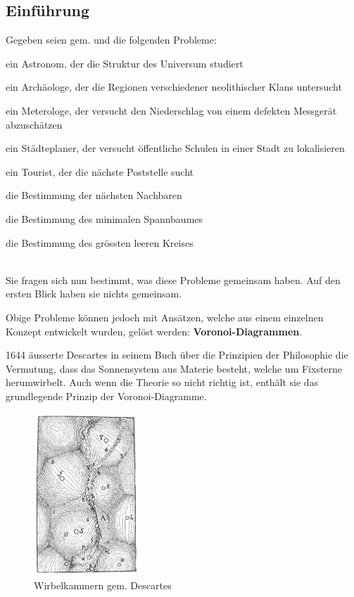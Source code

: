 \subsection{Einführung}
\label{subsec:voronoi-introduction}

Gegeben seien gem. \cite{klein2005algorithmischegeometrie} und \cite{atsuyuki2000spatialtessellations} die folgenden Probleme:

\begin{compactitem}
	\item ein Astronom, der die Struktur des Universum studiert
    \item ein Archäologe, der die Regionen verschiedener neolithischer Klans untersucht
    \item ein Meterologe, der versucht den Niederschlag von einem defekten Messgerät abzuschätzen
    \item ein Städteplaner, der versucht öffentliche Schulen in einer Stadt zu lokalisieren
    \item ein Tourist, der die nächste Poststelle sucht
    \item die Bestimmung der nächsten Nachbaren
    \item die Bestimmung des minimalen Spannbaumes
    \item die Bestimmung des grössten leeren Kreises
\end{compactitem}

\noindent\hspace*{0mm} \\Sie fragen sich nun bestimmt, was diese Probleme gemeinsam haben. Auf den ersten Blick haben sie nichts gemeinsam.

Obige Probleme können jedoch mit Ansätzen, welche aus einem einzelnen Konzept entwickelt wurden, gelöst werden: \textbf{Voronoi-Diagrammen}. \parencite{atsuyuki2000spatialtessellations}

1644 äusserte Descartes in seinem Buch über die Prinzipien der Philosophie die Vermutung, dass das Sonnensystem aus Materie besteht, welche um Fixsterne herumwirbelt.
Auch wenn die Theorie so nicht richtig ist, enthält sie das grundlegende Prinzip der Voronoi-Diagramme.\parencite{klein2005algorithmischegeometrie}

\newpage

\begin{figure}
\centering
\includegraphics[width=150px]{images/descartes_vortices.jpg}
\caption{Wirbelkammern gem. Descartes}
\label{fig:descartesVortices}
\end{figure}

